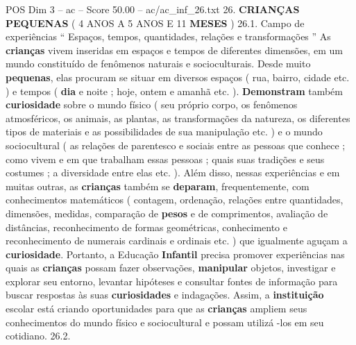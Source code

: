 \begin{textsample}{POS Dim 3 – ac – Score 50.00 – ac/ac\_inf\_26.txt}  \label{ex:f3_pos_026}
26. \textbf{CRIANÇAS} \textbf{PEQUENAS} ( 4 ANOS A 5 ANOS E 11 \textbf{MESES} ) 26.1.
Campo de experiências “ Espaços, tempos, quantidades, relações e transformações ” As \textbf{crianças} vivem inseridas em espaços e tempos de diferentes dimensões, em um mundo constituído de fenômenos naturais e socioculturais.
Desde muito \textbf{pequenas}, elas procuram se situar em diversos espaços ( rua, bairro, cidade etc. ) e tempos ( \textbf{dia} e noite ; hoje, ontem e amanhã etc. ). \textbf{Demonstram} também \textbf{curiosidade} sobre o mundo físico ( seu próprio corpo, os fenômenos atmosféricos, os animais, as plantas, as transformações da natureza, os diferentes tipos de materiais e as possibilidades de sua manipulação etc. ) e o mundo sociocultural ( as relações de parentesco e sociais entre as pessoas que conhece ; como vivem e em que trabalham essas pessoas ; quais suas tradições e seus costumes ; a diversidade entre elas etc. ).
Além disso, nessas experiências e em muitas outras, as \textbf{crianças} também se \textbf{deparam}, frequentemente, com conhecimentos matemáticos ( contagem, ordenação, relações entre quantidades, dimensões, medidas, comparação de \textbf{pesos} e de comprimentos, avaliação de distâncias, reconhecimento de formas geométricas, conhecimento e reconhecimento de numerais cardinais e ordinais etc. ) que igualmente aguçam a \textbf{curiosidade}.
Portanto, a Educação \textbf{Infantil} precisa promover experiências nas quais as \textbf{crianças} possam fazer observações, \textbf{manipular} objetos, investigar e explorar seu entorno, levantar hipóteses e consultar fontes de informação para buscar respostas às suas \textbf{curiosidades} e indagações.
Assim, a \textbf{instituição} escolar está criando oportunidades para que as \textbf{crianças} ampliem seus conhecimentos do mundo físico e sociocultural e possam utilizá -los em seu cotidiano. 26.2.

\end{textsample}
